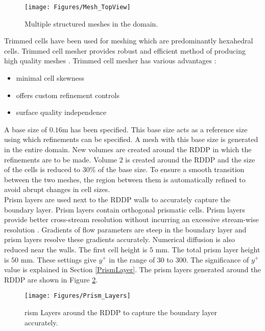 \begin{figure}
\centering
\texttt{[image: Figures/Mesh\_TopView]}
\caption{\label{fig:Mesh_TopView}Multiple structured meshes in the domain.}
\end{figure}
\noindent Trimmed cells have been used for meshing which are predominantly hexahedral cells. Trimmed cell mesher provides robust and efficient method of producing high quality meshes \cite{TrimmedCells}. Trimmed cell mesher has various advantages \cite{TrimmedCells}:
\begin{itemize}
\itemsep0em %
\item minimal cell skewness
\item offers custom refinement controls
\item surface quality independence
\end{itemize}
A base size of $0.16$m has been specified. This base size acts as a reference size using which refinements can be specified. A mesh with this base size is generated in the entire domain. New volumes are created around the RDDP in which the refinements are to be made. Volume $2$ is created around the RDDP and the size of the cells is reduced to $30\%$ of the base size. To ensure a smooth transition between the two meshes, the region between them is automatically refined to avoid abrupt changes in cell sizes.\\
Prism layers are used next to the RDDP walls to accurately capture the boundary layer. Prism layers contain orthogonal prismatic cells. Prism layers provide better cross-stream resolution without incurring an excessive stream-wise resolution \cite{PrismLayers}. Gradients of flow parameters are steep in the boundary layer and prism layers resolve these gradients accurately. Numerical diffusion is also reduced near the walls. The first cell height is $5$ mm. The total prism layer height is $50$ mm. These settings give $y^+$ in the range of 30 to 300. The significance of $y^+$ value is explained in Section \ref{PrismLayer}. The prism layers generated around the RDDP are shown in Figure \ref{fig:Prism_Layers}.\\

\begin{figure}
\centering
\texttt{[image: Figures/Prism\_Layers]}
\caption{\label{fig:Prism_Layers}rism Layers around the RDDP to capture the boundary layer accurately.}
\end{figure}

